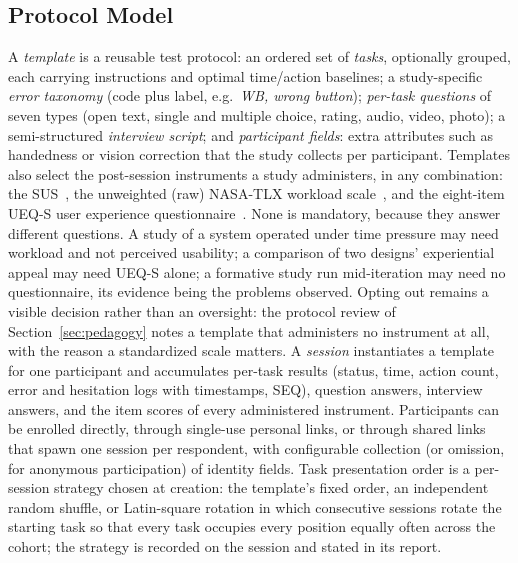 \documentclass[conference]{IEEEtran}
\begin{document}
\subsection{Protocol Model}
A \emph{template} is a reusable test protocol: an ordered set of
\emph{tasks}, optionally grouped, each carrying instructions and optimal
time/action baselines; a study-specific \emph{error taxonomy} (code plus
label, e.g.\ \emph{WB, wrong button}); \emph{per-task questions} of seven
types (open text, single and multiple choice, rating, audio, video,
photo); a semi-structured \emph{interview script}; and \emph{participant
fields}: extra attributes such as handedness or vision correction that
the study collects per participant. Templates also select the
post-session instruments a study administers, in any combination: the
SUS~\cite{brooke1996sus}, the unweighted (raw) NASA-TLX workload
scale~\cite{hart2006nasatlx}, and the eight-item UEQ-S user experience
questionnaire~\cite{schrepp2017ueqs}. None is mandatory, because they
answer different questions. A study of a system operated under time
pressure may need workload and not perceived usability; a comparison of
two designs' experiential appeal may need UEQ-S alone; a formative study
run mid-iteration may need no questionnaire, its evidence being the
problems observed. Opting out remains a visible decision rather than an
oversight: the protocol review of Section~\ref{sec:pedagogy} notes a template that
administers no instrument at all, with the reason a standardized scale
matters. A \emph{session} instantiates a
template for one participant and accumulates per-task results (status,
time, action count, error and hesitation logs with timestamps, SEQ),
question answers, interview answers, and the item scores of every
administered instrument.
Participants can be enrolled directly, through single-use personal links,
or through shared links that spawn one session per respondent, with
configurable collection (or omission, for anonymous participation) of
identity fields. Task presentation order is a per-session strategy chosen
at creation: the template's fixed order, an independent random shuffle,
or Latin-square rotation in which consecutive sessions rotate the
starting task so that every task occupies every position equally often
across the cohort; the strategy is recorded on the session and stated in
its report.
\end{document}
